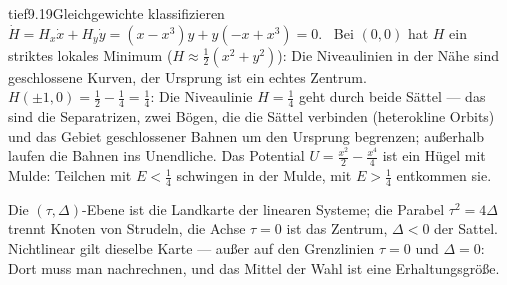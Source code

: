 \begin{loesungkarte}{tief}{9.19}{Gleichgewichte klassifizieren}
$\dot H = H_x\dot x + H_y\dot y = (x - x^{3})y + y(-x + x^{3}) = 0$. \checkmark\ Bei $(0, 0)$ hat $H$ ein striktes lokales Minimum ($H\approx\frac12(x^{2} + y^{2})$): Die Niveaulinien in der Nähe sind geschlossene Kurven, der Ursprung ist ein echtes Zentrum. $H(\pm1, 0) = \frac12 - \frac14 = \frac14$: Die Niveaulinie $H = \frac14$ geht durch beide Sättel --- das sind die Separatrizen, zwei Bögen, die die Sättel verbinden (heterokline Orbits) und das Gebiet geschlossener Bahnen um den Ursprung begrenzen; außerhalb laufen die Bahnen ins Unendliche. Das Potential $U = \frac{x^{2}}2 - \frac{x^{4}}4$ ist ein Hügel mit Mulde: Teilchen mit $E < \frac14$ schwingen in der Mulde, mit $E > \frac14$ entkommen sie.
\begin{mitnehmen}\kastentext
Die $(\tau, \Delta)$-Ebene ist die Landkarte der linearen Systeme; die Parabel $\tau^{2} = 4\Delta$ trennt Knoten von Strudeln, die Achse $\tau = 0$ ist das Zentrum, $\Delta < 0$ der Sattel. Nichtlinear gilt dieselbe Karte --- außer auf den Grenzlinien $\tau = 0$ und $\Delta = 0$: Dort muss man nachrechnen, und das Mittel der Wahl ist eine Erhaltungsgröße.
\end{mitnehmen}
\end{loesungkarte}

